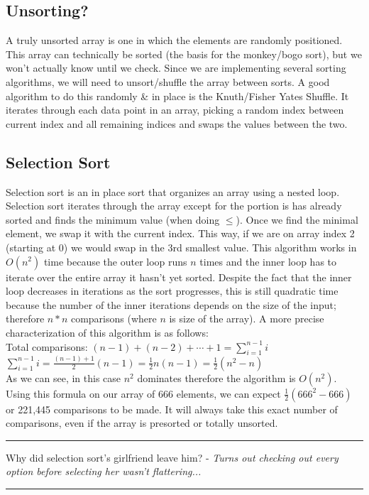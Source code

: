 \documentclass[letterpaper, 10pt]{article}
\begin{document}
\subsection{Unsorting?}
A truly unsorted array is one in which the elements are randomly positioned. This array can technically be sorted (the basis for the monkey/bogo sort), but we won't actually know until we check. Since we are implementing several sorting algorithms, we will need to unsort/shuffle the array between sorts. A good algorithm to do this randomly \& in place is the Knuth/Fisher Yates Shuffle. It iterates through each data point in an array, picking a random index between current index and all remaining indices and swaps the values between the two.

\subsection{Selection Sort}
Selection sort is an in place sort that organizes an array using a nested loop. Selection sort iterates through the array except for the portion is has already sorted and finds the minimum value (when doing $\leq$). Once we find the minimal element, we swap it with the current index. This way, if we are on array index 2 (starting at 0) we would swap in the 3rd smallest value. This algorithm works in $O(n^2)$ time because the outer loop runs $n$ times and the inner loop has to iterate over the entire array it hasn't yet sorted. Despite the fact that the inner loop decreases in iterations as the sort progresses, this is still quadratic time because the number of the inner iterations depends on the size of the input; therefore $n*n$ comparisons (where $n$ is size of the array). A more precise characterization of this algorithm is as follows: \\
Total comparisons: $(n - 1) + (n - 2) + \cdots + 1 = \sum_{i=1}^{n-1} i$ \\
$\sum_{i=1}^{n-1} i = \frac{(n-1)+1}{2}(n-1) = \frac{1}{2}n(n-1) = \frac{1}{2}(n^2-n)$ \\
As we can see, in this case $n^2$ dominates therefore the algorithm is $O(n^2)$. Using this formula on our array of 666 elements, we can expect $\frac{1}{2}(666^2-666)$ or 221,445 comparisons to be made. It will always take this exact number of comparisons, even if the array is presorted or totally unsorted. 

\hrule
\vspace{.25cm}
Why did selection sort's girlfriend leave him? - \textit{Turns out checking out every option before selecting her wasn't flattering...}\\
\hrule
\end{document}
